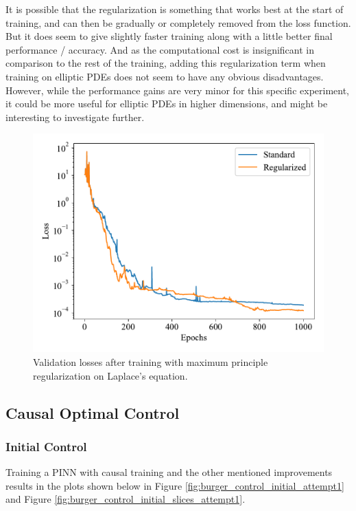 It is possible that the regularization is something that works best at the start of training, and can then be gradually or completely removed from the loss function. But it does seem to give slightly faster training along with a little better final performance / accuracy. And as the computational cost is insignificant in comparison to the rest of the training, adding this regularization term when training on elliptic PDEs does not seem to have any obvious disadvantages. However, while the performance gains are very minor for this specific experiment, it could be more useful for elliptic PDEs in higher dimensions, and might be interesting to investigate further.

\begin{figure}[H]
    \centering
    \includegraphics[width=1.0\linewidth]{Figures/IntermediateExperiments/Laplace/maxmin_losses.pdf}
    \caption{Validation losses after training with maximum principle regularization on Laplace's equation.}
    \label{fig:laplace_losses}
\end{figure}

\subsection{Causal Optimal Control}

\subsubsection{Initial Control}

Training a PINN with causal training and the other mentioned improvements results in the plots shown below in Figure \ref{fig:burger_control_initial_attempt1} and Figure \ref{fig:burger_control_initial_slices_attempt1}.

